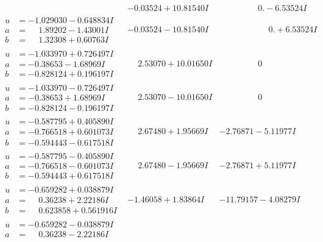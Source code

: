 \documentclass[1p]{elsarticle_modified}
\theoremstyle{definition}
\begin{document}
$$\begin{array}{c|c|c}
 & -0.03524 + 10.81540 I & \phantom{-0.000000 } 0. - 6.53524 I \\ \hline\begin{aligned}
u &= -1.029030 - 0.648834 I \\
a &= \phantom{-}1.89202 - 1.43001 I \\
b &= \phantom{-}1.32308 + 0.60763 I\end{aligned}
 & -0.03524 - 10.81540 I & \phantom{-0.000000 -}0. + 6.53524 I \\ \hline\begin{aligned}
u &= -1.033970 + 0.726497 I \\
a &= -0.38653 - 1.68969 I \\
b &= -0.828124 + 0.196197 I\end{aligned}
 & \phantom{-}2.53070 + 10.01650 I & \phantom{-0.000000 } 0 \\ \hline\begin{aligned}
u &= -1.033970 - 0.726497 I \\
a &= -0.38653 + 1.68969 I \\
b &= -0.828124 - 0.196197 I\end{aligned}
 & \phantom{-}2.53070 - 10.01650 I & \phantom{-0.000000 } 0 \\ \hline\begin{aligned}
u &= -0.587795 + 0.405890 I \\
a &= -0.766518 + 0.601073 I \\
b &= -0.594443 - 0.617518 I\end{aligned}
 & \phantom{-}2.67480 + 1.95669 I & -2.76871 - 5.11977 I \\ \hline\begin{aligned}
u &= -0.587795 - 0.405890 I \\
a &= -0.766518 - 0.601073 I \\
b &= -0.594443 + 0.617518 I\end{aligned}
 & \phantom{-}2.67480 - 1.95669 I & -2.76871 + 5.11977 I \\ \hline\begin{aligned}
u &= -0.659282 + 0.038879 I \\
a &= \phantom{-}0.36238 + 2.22186 I \\
b &= \phantom{-}0.623858 + 0.561916 I\end{aligned}
 & -1.46058 + 1.83864 I & -11.79157 - 4.08279 I \\ \hline\begin{aligned}
u &= -0.659282 - 0.038879 I \\
a &= \phantom{-}0.36238 - 2.22186 I \\

\end{aligned}
\end{array}$$
\end{document}

